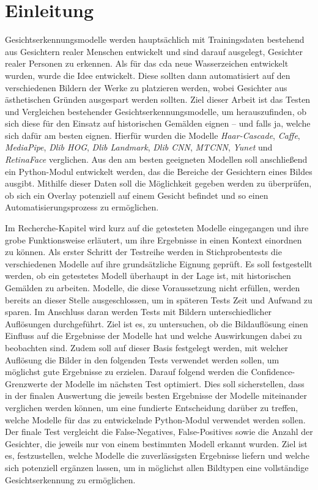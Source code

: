 \chapter{Einleitung}
%
Gesichtserkennungsmodelle werden hauptsächlich mit Trainingsdaten bestehend aus Gesichtern realer Menschen entwickelt und sind darauf ausgelegt, Gesichter realer Personen zu erkennen. Als für das \gls{cda} neue Wasserzeichen entwickelt wurden, wurde die Idee entwickelt. Diese sollten dann automatisiert auf den verschiedenen Bildern der Werke zu platzieren werden, wobei Gesichter aus ästhetischen Gründen ausgespart werden sollten. Ziel dieser Arbeit ist das Testen und Vergleichen bestehender Gesichtserkennungsmodelle, um herauszufinden, ob sich diese für den Einsatz auf historischen Gemälden eignen – und falls ja, welche sich dafür am besten eignen. Hierfür wurden die Modelle \textit{Haar-Cascade}, \textit{Caffe}, \textit{MediaPipe}, \textit{Dlib HOG}, \textit{Dlib Landmark}, \textit{Dlib CNN}, \textit{MTCNN}, \textit{Yunet} und \textit{RetinaFace} verglichen. Aus den am besten geeigneten Modellen soll anschließend ein Python-Modul entwickelt werden, das die Bereiche der Gesichtern eines Bildes ausgibt. Mithilfe dieser Daten soll die Möglichkeit gegeben werden zu überprüfen, ob sich ein Overlay potenziell auf einem Gesicht befindet und so einen Automatisierungsprozess zu ermöglichen.

Im Recherche-Kapitel wird kurz auf die getesteten Modelle eingegangen und ihre grobe Funktionsweise erläutert, um ihre Ergebnisse in einen Kontext einordnen zu können.
Als erster Schritt der Testreihe werden in Stichprobentests die verschiedenen Modelle auf ihre grundsätzliche Eignung geprüft. Es soll festgestellt werden, ob ein getestetes Modell überhaupt in der Lage ist, mit historischen Gemälden zu arbeiten. Modelle, die diese Voraussetzung nicht erfüllen, werden bereits an dieser Stelle ausgeschlossen, um in späteren Tests Zeit und Aufwand zu sparen.
Im Anschluss daran werden Tests mit Bildern unterschiedlicher Auflösungen durchgeführt. Ziel ist es, zu untersuchen, ob die Bildauflösung einen Einfluss auf die Ergebnisse der Modelle hat und welche Auswirkungen dabei zu beobachten sind. Zudem soll auf dieser Basis festgelegt werden, mit welcher Auflösung die Bilder in den folgenden Tests verwendet werden sollen, um möglichst gute Ergebnisse zu erzielen.
Darauf folgend werden die Confidence-Grenzwerte der Modelle im nächsten Test optimiert. Dies soll sicherstellen, dass in der finalen Auswertung die jeweils besten Ergebnisse der Modelle miteinander verglichen werden können, um eine fundierte Entscheidung darüber zu treffen, welche Modelle für das zu entwickelnde Python-Modul verwendet werden sollen.
Der finale Test vergleicht die False-Negatives, False-Positives sowie die Anzahl der Gesichter, die jeweils nur von einem bestimmten Modell erkannt wurden. Ziel ist es, festzustellen, welche Modelle die zuverlässigsten Ergebnisse liefern und welche sich potenziell ergänzen lassen, um in möglichst allen Bildtypen eine vollständige Gesichtserkennung zu ermöglichen.
